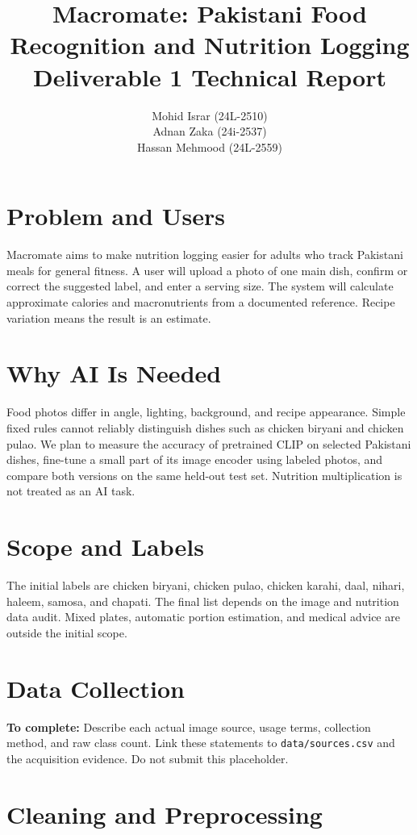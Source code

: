 \documentclass[11pt,a4paper]{article}
\title{Macromate: Pakistani Food Recognition and Nutrition Logging\\Deliverable 1 Technical Report}
\author{Mohid Israr (24L-2510)\\Adnan Zaka (24i-2537)\\Hassan Mehmood (24L-2559)}
\date{}
\begin{document}
\maketitle

\section{Problem and Users}
Macromate aims to make nutrition logging easier for adults who track Pakistani meals for general fitness. A user will upload a photo of one main dish, confirm or correct the suggested label, and enter a serving size. The system will calculate approximate calories and macronutrients from a documented reference. Recipe variation means the result is an estimate.

\section{Why AI Is Needed}
Food photos differ in angle, lighting, background, and recipe appearance. Simple fixed rules cannot reliably distinguish dishes such as chicken biryani and chicken pulao. We plan to measure the accuracy of pretrained CLIP on selected Pakistani dishes, fine-tune a small part of its image encoder using labeled photos, and compare both versions on the same held-out test set. Nutrition multiplication is not treated as an AI task.

\section{Scope and Labels}
The initial labels are chicken biryani, chicken pulao, chicken karahi, daal, nihari, haleem, samosa, and chapati. The final list depends on the image and nutrition data audit. Mixed plates, automatic portion estimation, and medical advice are outside the initial scope.

\section{Data Collection}
\textbf{To complete:} Describe each actual image source, usage terms, collection method, and raw class count. Link these statements to \texttt{data/sources.csv} and the acquisition evidence. Do not submit this placeholder.

\sloppy
\section{Cleaning and Preprocessing}
\end{document}
